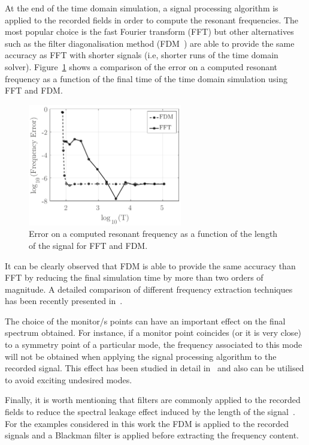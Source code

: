 At the end of the time domain simulation, a signal processing algorithm is applied to the recorded fields in order to compute the resonant frequencies. The most popular choice is the fast Fourier transform (FFT) but other alternatives such as the filter diagonalisation method (FDM~\cite{FDM}) are able to provide the same accuracy as FFT with shorter signals (i.e, shorter runs of the time domain solver). Figure~\ref{fig:comparisonFFT_FDM} shows a comparison of the error on a computed resonant frequency as a function of the final time of the time domain simulation using FFT and FDM. 
\begin{figure}[!ht]
	\centering
	\includegraphics[width=0.6\textwidth]{figs/comparisonFFT_FDM}
	\caption{Error on a computed resonant frequency as a function of the length of the signal for FFT and FDM.}
	\label{fig:comparisonFFT_FDM}
\end{figure}
It can be clearly observed that FDM is able to provide the same accuracy than FFT by reducing the final simulation time by more than two orders of magnitude. A detailed comparison of different frequency extraction techniques has been recently presented in~\cite{dantanarayana2014resonant}.

The choice of the monitor/s points can have an important effect on the final spectrum obtained. For instance, if a monitor point coincides (or it is very close) to a symmetry point of a particular mode, the frequency associated to this mode will not be obtained when applying the signal processing algorithm to the recorded signal. This effect has been studied in detail in~\cite{stark2009positional} and also can be utilised to avoid exciting undesired modes. 

Finally, it is worth mentioning that filters are commonly applied to the recorded fields to reduce the spectral leakage effect induced by the length of the signal~\cite{harris1978use,madisetti2009digital}. For the examples considered in this work the FDM is applied to the recorded signals and a Blackman filter is applied before extracting the frequency content. 

